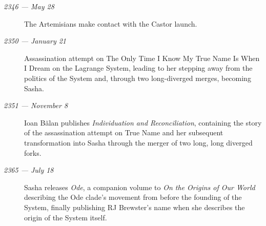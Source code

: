 \begin{description}
\item[\emph{2346 --- May 28}]
The Artemisians make contact with the Castor launch.
\item[\emph{2350 --- January 21}]
Assassination attempt on The Only Time I Know My True Name Is When I Dream on the Lagrange System, leading to her stepping away from the politics of the System and, through two long-diverged merges, becoming Sasha.
\item[\emph{2351 --- November 8}]
Ioan Bălan publishes \emph{Individuation and Reconciliation}, containing the story of the assassination attempt on True Name and her subsequent transformation into Sasha through the merger of two long, long diverged forks.
\item[\emph{2365 --- July 18}]
Sasha releases \emph{Ode}, a companion volume to \emph{On the Origins of Our World} describing the Ode clade's movement from before the founding of the System, finally publishing RJ Brewster's name when she describes the origin of the System itself.
\end{description}
